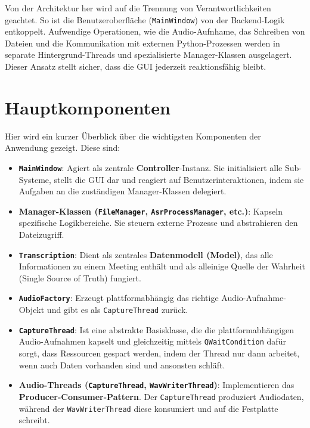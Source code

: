 Von der Architektur her wird auf die Trennung von Verantwortlichkeiten geachtet. So ist die Benutzeroberfläche (\texttt{MainWindow}) von der Backend-Logik entkoppelt. Aufwendige Operationen, wie die Audio-Aufnhame, das Schreiben von Dateien und die Kommunikation mit externen Python-Prozessen werden in separate Hintergrund-Threads und spezialisierte Manager-Klassen ausgelagert. Dieser Ansatz stellt sicher, dass die \ac{GUI} jederzeit reaktionsfähig bleibt.



\section{Hauptkomponenten}

Hier wird ein kurzer Überblick über die wichtigsten Komponenten der Anwendung gezeigt. Diese sind:

\begin{itemize}
    \item \textbf{\texttt{MainWindow}}: Agiert als zentrale \textbf{Controller}-Instanz. Sie initialisiert alle Sub-Systeme, stellt die GUI dar und reagiert auf Benutzerinteraktionen, indem sie Aufgaben an die zuständigen Manager-Klassen delegiert.
    \item \textbf{Manager-Klassen (\texttt{FileManager}, \texttt{AsrProcessManager}, etc.)}: Kapseln spezifische Logikbereiche. Sie steuern externe Prozesse und abstrahieren den Dateizugriff.
    \item \textbf{\texttt{Transcription}}: Dient als zentrales \textbf{Datenmodell (Model)}, das alle Informationen zu einem Meeting enthält und als alleinige Quelle der Wahrheit (\glqq Single Source of Truth\grqq) fungiert.
    \item \textbf{\texttt{AudioFactory}}: Erzeugt plattformabhängig das richtige Audio-Aufnahme-Objekt und gibt es als \texttt{CaptureThread} zurück.
    \item \textbf{\texttt{CaptureThread}}: Ist eine abstrakte Basisklasse, die die plattformabhängigen Audio-Aufnahmen kapselt und gleichzeitig mittels \texttt{QWaitCondition} dafür sorgt, dass Ressourcen gespart werden, indem der Thread nur dann arbeitet, wenn auch Daten vorhanden sind und ansonsten schläft.
    \item \textbf{Audio-Threads (\texttt{CaptureThread}, \texttt{WavWriterThread})}: Implementieren das \textbf{Producer-Consumer-Pattern}. Der \texttt{CaptureThread} produziert Audiodaten, während der \texttt{WavWriterThread} diese konsumiert und auf die Festplatte schreibt.
\end{itemize}


